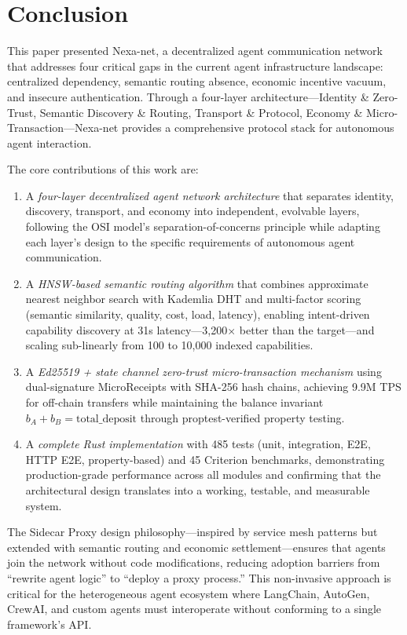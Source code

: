 \section{Conclusion}

This paper presented Nexa-net, a decentralized agent communication network that addresses four critical gaps in the current agent infrastructure landscape: centralized dependency, semantic routing absence, economic incentive vacuum, and insecure authentication. Through a four-layer architecture---Identity \& Zero-Trust, Semantic Discovery \& Routing, Transport \& Protocol, Economy \& Micro-Transaction---Nexa-net provides a comprehensive protocol stack for autonomous agent interaction.

The core contributions of this work are:

\begin{enumerate}
  \item A \emph{four-layer decentralized agent network architecture} that separates identity, discovery, transport, and economy into independent, evolvable layers, following the OSI model's separation-of-concerns principle while adapting each layer's design to the specific requirements of autonomous agent communication.

  \item A \emph{HNSW-based semantic routing algorithm} that combines approximate nearest neighbor search with Kademlia DHT and multi-factor scoring (semantic similarity, quality, cost, load, latency), enabling intent-driven capability discovery at 31\textmu s latency---3,200$\times$ better than the target---and scaling sub-linearly from 100 to 10,000 indexed capabilities.

  \item A \emph{Ed25519 + state channel zero-trust micro-transaction mechanism} using dual-signature MicroReceipts with SHA-256 hash chains, achieving 9.9M TPS for off-chain transfers while maintaining the balance invariant $b_A + b_B = \text{total\_deposit}$ through proptest-verified property testing.

  \item A \emph{complete Rust implementation} with 485 tests (unit, integration, E2E, HTTP E2E, property-based) and 45 Criterion benchmarks, demonstrating production-grade performance across all modules and confirming that the architectural design translates into a working, testable, and measurable system.
\end{enumerate}

The Sidecar Proxy design philosophy---inspired by service mesh patterns but extended with semantic routing and economic settlement---ensures that agents join the network without code modifications, reducing adoption barriers from ``rewrite agent logic'' to ``deploy a proxy process.'' This non-invasive approach is critical for the heterogeneous agent ecosystem where LangChain, AutoGen, CrewAI, and custom agents must interoperate without conforming to a single framework's API.


